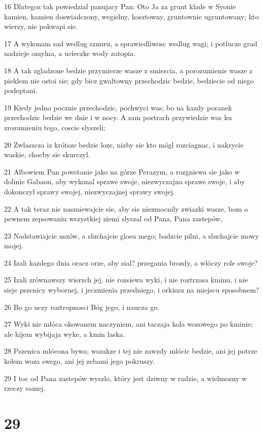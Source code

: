 \par 16 Dlategoz tak powiedzial panujacy Pan: Oto Ja za grunt klade w Syonie kamien, kamien doswiadczony, wegielny, kosztowny, gruntownie ugruntowany; kto wierzy, nie pokwapi sie.
\par 17 A wykonam sad wedlug sznuru, a sprawiedliwosc wedlug wagi; i potlucze grad nadzieje omylna, a ucieczke wody zatopia.
\par 18 A tak zgladzone bedzie przymierze wasze z smiercia, a porozumienie wasze z pieklem nie ostoi sie; gdy bicz gwaltowny przechodzic bedzie, bedziecie od niego podeptani.
\par 19 Kiedy jedno pocznie przechodzic, pochwyci was; bo na kazdy poranek przechodzic bedzie we dnie i w nocy. A sam postrach przywiedzie was ku zrozumieniu tego, coscie slyszeli;
\par 20 Zwlaszcza iz krótsze bedzie loze, nizby sie kto mógl rozciagnac, i nakrycie waskie, chocby sie skurczyl.
\par 21 Albowiem Pan powstanie jako na górze Perazym, a rozgniewa sie jako w dolinie Gabaon, aby wykonal sprawe swoje, niezwyczajna sprawe swoje, i aby dokonczyl sprawy swojej, niezwyczajnej sprawy swojej.
\par 22 A tak teraz nie nasmiewajcie sie, aby sie niezmocnily zwiazki wasze, bom o pewnem zepsowaniu wszystkiej ziemi slyszal od Pana, Pana zastepów,
\par 23 Nadstawiajcie uszów, a sluchajcie glosu mego; badzcie pilni, a sluchajcie mowy mojej.
\par 24 Izali kazdego dnia oracz orze, aby sial? przegania brozdy, a wlóczy role swoje?
\par 25 Izali zrównawszy wierzch jej, nie rozsiewa wyki, i nie roztrzasa kminu, i nie sieje pszenicy wybornej, i jeczmienia przedniego, i orkiszu na miejscu sposobnem?
\par 26 Bo go uczy roztropnosci Bóg jego, i naucza go.
\par 27 Wyki nie mlóca okowanem naczyniem, ani taczaja kola wozowego po kminie; ale kijem wybijaja wyke, a kmin laska.
\par 28 Pszenica mlócona bywa; wszakze i tej nie zawzdy mlócic bedzie, ani jej potrze kolem woza swego, ani jej zebami jego pokruszy.
\par 29 I toc od Pana zastepów wyszlo, który jest dziwny w radzie, a wielmozny w rzeczy samej.

\chapter{29}

